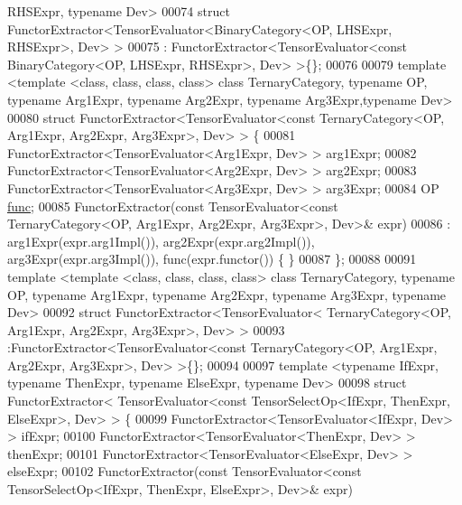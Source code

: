 \begin{DoxyCode}
      RHSExpr, \textcolor{keyword}{typename} Dev>
00074 \textcolor{keyword}{struct }FunctorExtractor<TensorEvaluator<BinaryCategory<OP,  LHSExpr, RHSExpr>, Dev> >
00075 : FunctorExtractor<TensorEvaluator<const BinaryCategory<OP,  LHSExpr, RHSExpr>, Dev> >\{\};
00076 
00079 \textcolor{keyword}{template} <\textcolor{keyword}{template} <\textcolor{keyword}{class}, \textcolor{keyword}{class}, \textcolor{keyword}{class}, \textcolor{keyword}{class}> \textcolor{keyword}{class }TernaryCategory, \textcolor{keyword}{typename} OP, \textcolor{keyword}{typename} Arg1Expr, \textcolor{keyword}{
      typename} Arg2Expr, \textcolor{keyword}{typename} Arg3Expr,\textcolor{keyword}{typename} Dev>
00080 \textcolor{keyword}{struct }FunctorExtractor<TensorEvaluator<const TernaryCategory<OP, Arg1Expr, Arg2Expr, Arg3Expr>, Dev> > \{
00081   FunctorExtractor<TensorEvaluator<Arg1Expr, Dev> > arg1Expr;
00082   FunctorExtractor<TensorEvaluator<Arg2Expr, Dev> > arg2Expr;
00083   FunctorExtractor<TensorEvaluator<Arg3Expr, Dev> > arg3Expr;
00084   OP \hyperlink{structfunc}{func};
00085   FunctorExtractor(\textcolor{keyword}{const} TensorEvaluator<\textcolor{keyword}{const} TernaryCategory<OP, Arg1Expr, Arg2Expr, Arg3Expr>, Dev>& 
      expr)
00086   : arg1Expr(expr.arg1Impl()), arg2Expr(expr.arg2Impl()), arg3Expr(expr.arg3Impl()), func(expr.functor()) \{
      \}
00087 \};
00088 
00091 \textcolor{keyword}{template} <\textcolor{keyword}{template} <\textcolor{keyword}{class}, \textcolor{keyword}{class}, \textcolor{keyword}{class}, \textcolor{keyword}{class}> \textcolor{keyword}{class }TernaryCategory, \textcolor{keyword}{typename} OP, \textcolor{keyword}{typename} Arg1Expr, \textcolor{keyword}{
      typename} Arg2Expr, \textcolor{keyword}{typename} Arg3Expr, \textcolor{keyword}{typename} Dev>
00092 \textcolor{keyword}{struct }FunctorExtractor<TensorEvaluator< TernaryCategory<OP, Arg1Expr, Arg2Expr, Arg3Expr>, Dev> >
00093 :FunctorExtractor<TensorEvaluator<const TernaryCategory<OP, Arg1Expr, Arg2Expr, Arg3Expr>, Dev> >\{\};
00094 
00097 \textcolor{keyword}{template} <\textcolor{keyword}{typename} IfExpr, \textcolor{keyword}{typename} ThenExpr, \textcolor{keyword}{typename} ElseExpr, \textcolor{keyword}{typename} Dev>
00098 \textcolor{keyword}{struct }FunctorExtractor< TensorEvaluator<const TensorSelectOp<IfExpr, ThenExpr, ElseExpr>, Dev> > \{
00099   FunctorExtractor<TensorEvaluator<IfExpr, Dev> > ifExpr;
00100   FunctorExtractor<TensorEvaluator<ThenExpr, Dev> > thenExpr;
00101   FunctorExtractor<TensorEvaluator<ElseExpr, Dev> > elseExpr;
00102   FunctorExtractor(\textcolor{keyword}{const} TensorEvaluator<\textcolor{keyword}{const} TensorSelectOp<IfExpr, ThenExpr, ElseExpr>, Dev>& expr)

\end{DoxyCode}
